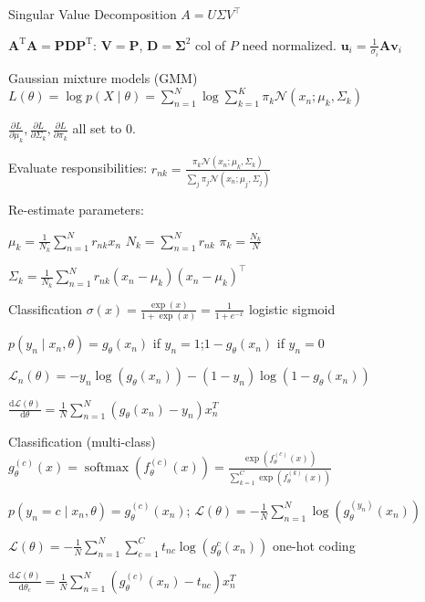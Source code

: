 \documentclass[UTF8,a4paper]{article}
\begin{document}
\begin{cheatsheetblock}{Singular Value Decomposition}
    $A=U \Sigma V^{\top}$

    $\bm{A}^{\mathrm{T}} \bm{A}=\bm{P} \bm{D} \bm{P}^{\mathrm{T}}$: \hfill $\bm{V} = \bm{P}$, $\bm{D} = \bm{\Sigma}^2$ \hfill col of $P$ need normalized.
    $\bm{u}_i = \frac{1}{\sigma_i} \bm{A} \bm{v}_i$

\end{cheatsheetblock}

\begin{cheatsheetblock}{Gaussian mixture models (GMM)}
    $L(\theta)=\log p(X \mid \theta)=\sum_{n=1}^N \log \sum_{k=1}^K \pi_k \mathcal{N}\left(x_n ; \mu_k, \Sigma_k\right)$

    $\frac{\partial L}{\partial \mu_k}, \frac{\partial L}{\partial \Sigma_k} , \frac{\partial L}{\partial \pi_k}$ all set to 0.

    Evaluate responsibilities: \quad $r_{n k}=\frac{\pi_k \mathcal{N}\left(x_n ; \mu_k, \Sigma_k\right)}{\sum_j \pi_j \mathcal{N}\left(x_n ; \mu_j, \Sigma_j\right)}$

    Re-estimate parameters:

    $\mu_k=\frac{1}{N_k} \sum_{n=1}^N r_{n k} x_n$ \hfill $N_k=\sum_{n=1}^N r_{n k}$ \hfill $\pi_k = \frac{N_k}{N}$

    $\Sigma_k=\frac{1}{N_k} \sum_{n=1}^N r_{n k}\left(x_n-\mu_k\right)\left(x_n-\mu_k\right)^{\top}$
\end{cheatsheetblock}

\begin{cheatsheetblock}{Classification}
    $\sigma(x) = \frac{\exp(x)}{1 + \exp(x)} = \frac{1}{1 + e^{-x}}$ \hfill logistic sigmoid

    $p(y_n \mid x_n, \theta)=g_\theta(x_n)$ if $y_n=1$;\quad $1-g_\theta(x_n)$ if $y_n=0$

    $\mathscr{L}_n(\theta)=-y_n \log \left(g_\theta\left(x_n\right)\right)-\left(1-y_n\right) \log \left(1-g_\theta\left(x_n\right)\right)$

    $\frac{\mathrm{d} \mathscr{L}(\theta)}{\mathrm{d} \theta}=\frac{1}{N} \sum_{n=1}^N\left(g_\theta\left(x_n\right)-y_n\right) x_n^T$
\end{cheatsheetblock}

\begin{cheatsheetblock}{Classification (multi-class)}
    $g_\theta^{(c)}(x)=\operatorname{softmax}\left(f_\theta^{(c)}(x)\right)=\frac{\exp \left(f_\theta^{(c)}(x)\right)}{\sum_{k=1}^C \exp \left(f_\theta^{(k)}(x)\right)}$

    $p\left(y_n=c \mid x_n, \theta\right)=g_\theta^{(c)}\left(x_n\right)$; $\mathscr{L}(\theta)=-\frac{1}{N} \sum_{n=1}^N \log \left(g_\theta^{\left(y_n\right)}\left(x_n\right)\right)$

    $\mathscr{L}(\theta)=-\frac{1}{N} \sum_{n=1}^N \sum_{c=1}^C t_{n c} \log \left(g_\theta^c\left(x_n\right)\right)$ \hfill one-hot coding
    
    $\frac{\mathrm{d} \mathscr{L}(\theta)}{\mathrm{d} \theta_c}=\frac{1}{N} \sum_{n=1}^N\left(g_\theta^{(c)}\left(x_n\right)-t_{n c}\right) x_n^T$
\end{cheatsheetblock}
\end{document}
